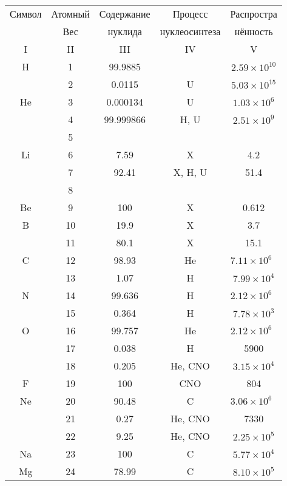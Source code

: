 \documentclass[a5paper,openany]{book}
\begin{document}
\begin{table}[h!]
	{\small
		\begin{tabular}{ccccc}
			Символ  & Атомный &  Содержание  & Процесс & Распростра   \\
			~ & Вес &  нуклида  &  нуклеосинтеза  & нённость  \\
			\hline 
			I & II &  III  & IV & V \\
			\hline 
			H & 1 & 99.9885 &  &  $2.59 \times 10^{10}$\\ [1mm]
			& 2 & 0.0115 & U & $5.03 \times 10^{15}$\\ [1mm]
			He & 3 & 0.000134 & U &  $1.03 \times 10^{6}$\\ [1mm]
			& 4 & 99.999866 & H, U & $2.51 \times 10^{9}$\\ [1mm]
			& 5 & &  & \\ [1mm]
			Li & 6 & 7.59 & X &  4.2 \\ [1mm]
			& 7 & 92.41 & X, H, U & 51.4\\ [1mm]
			& 8 & &  & \\ [1mm]
			Be & 9 & 100 & X  &  0.612 \\ [1mm]
			B & 10 & 19.9 & X &  3.7 \\ [1mm]
			& 11 & 80.1 & X & 15.1\\ [1mm]
			\hline 			
			C & 12 & 98.93 & He &  $7.11 \times 10^{6}$\ \\ [1mm]
			& 13 & 1.07 & H & $7.99 \times 10^{4}$ \\ [1mm]
			N & 14 & 99.636 & H &  $2.12 \times 10^{6}$\ \\ [1mm]
			& 15 & 0.364 & H & $7.78 \times 10^{3}$ \\ [1mm] 
			O & 16 & 99.757 & He &  $2.12 \times 10^{6}$\ \\ [1mm]
			& 17 & 0.038 & H & 5900 \\ [1mm] 			
			& 18 & 0.205 & He, CNO & $3.15 \times 10^{4}$ \\ [1mm] 
			F & 19 & 100 & CNO &  804 \\ [1mm] 
			Ne & 20 & 90.48 & C &  $3.06 \times 10^{6}$\ \\ [1mm]
			& 21 & 0.27 & He, CNO & 7330 \\ [1mm] 			
			& 22 & 9.25 & He, CNO & $2.25 \times 10^{5}$ \\ [1mm] 
			Na & 23 & 100 & C &   $5.77 \times 10^{4}$ \\ [1mm] 
			Mg & 24 & 78.99 & C &  $8.10 \times 10^{5}$ \\ [1mm]

\end{tabular}}
\end{table}
\end{document}
